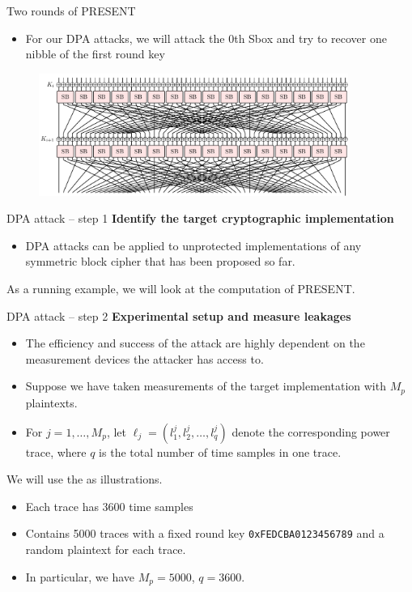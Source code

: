 \begin{frame}{Two rounds of PRESENT}
    \begin{itemize}
        \item For our DPA attacks, we will attack the $0$th Sbox and try to recover one nibble of the first round key
    \end{itemize}
    \begin{figure}
    \centering
    \includegraphics[width=0.9\textwidth]{fig/PRESENT_two_rounds.pdf}
\end{figure}
\end{frame}

\begin{frame}{DPA attack -- step 1}
\textbf{Identify the target cryptographic implementation}
    \begin{itemize}
        \item DPA attacks can be applied to unprotected implementations of any symmetric block cipher that has been proposed so far.
    \end{itemize}
    \begin{example}
        As a running example, we will look at the computation of PRESENT.
    \end{example}
\end{frame}

\begin{frame}{DPA attack -- step 2}
\textbf{Experimental setup and measure leakages}
    \begin{itemize}
        \item The efficiency and success of the attack are highly dependent on the measurement devices the attacker has access to.
        \item Suppose we have taken measurements of the target implementation with $M_p$ plaintexts.
       \item For $j=1,\dots,M_p$, let $\boldsymbol{\ell}_j=(l^{j}_1,
    l^{j}_2,\dots,l^j_q)$ denote the corresponding power trace, where $q$ is the total number of time samples in one trace.
    \end{itemize}
    \begin{example}
    We will use the \dataranone as illustrations.
        \begin{itemize}
                \item Each trace has $3600$ time samples
                \item Contains 5000 traces with a fixed round key \texttt{0xFEDCBA0123456789} and a random plaintext for each trace.
            \item In particular, we have $M_p=5000$, $q=3600$.
        \end{itemize}
    \end{example}
\end{frame}

